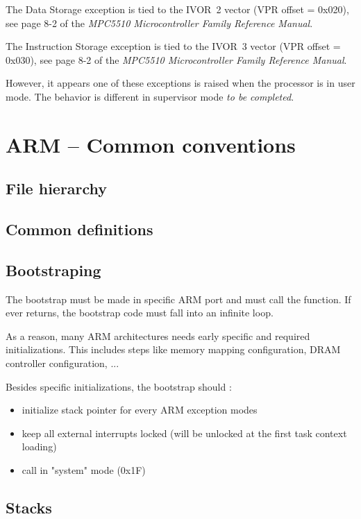 The Data Storage exception is tied to the IVOR~2 vector (VPR offset = 0x020), see page 8-2 of the {\em MPC5510 Microcontroller Family Reference Manual}.

The Instruction Storage exception is tied to the IVOR~3 vector (VPR offset = 0x030), see page 8-2 of the {\em MPC5510 Microcontroller Family Reference Manual}.

However, it appears one of these exceptions is raised when the processor is in user mode. The behavior is different in supervisor mode {\em to be completed}.

\section{ARM -- Common conventions}

\subsection{File hierarchy}

\subsection{Common definitions}

\subsection{Bootstraping}

The bootstrap must be made in specific ARM port and must call the  function. If  ever returns, the bootstrap code must fall into an infinite loop.

As a reason, many ARM architectures needs early specific and required initializations. This includes steps like memory mapping configuration, DRAM controller configuration, ...

Besides specific initializations, the bootstrap should :
\begin{itemize}
\item initialize stack pointer for every ARM exception modes
\item keep all external interrupts locked (will be unlocked at the first task context loading)
\item call  in "system" mode (0x1F)
\end{itemize}

\subsection{Stacks}

